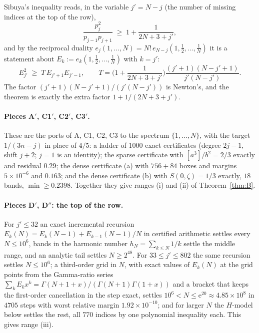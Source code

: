\documentclass[12pt]{article}
\newcommand{\ee}{\mathrm{e}}
\begin{document}
Sibuya's inequality reads, in the variable $j' = N - j$ (the number of missing indices at the top of the row),
\[
\frac{p_j^2}{p_{j-1}p_{j+1}} \;\ge\; 1 + \frac{1}{2N+3+j'} ,
\]
and by the reciprocal duality $e_j(1,\dots,N) = N!\,e_{N-j}(1,\tfrac12,\dots,\tfrac1N)$ it is a statement about $E_k := e_k(1,\tfrac12,\dots,\tfrac1N)$ with $k = j'$:
\begin{equation}\label{eq:sibuyaE}
E_{j'}^2 \;\ge\; T\,E_{j'+1}E_{j'-1}, \qquad T = \Big(1+\frac{1}{2N+3+j'}\Big)\frac{(j'+1)(N-j'+1)}{j'(N-j')} .
\end{equation}
The factor $(j'+1)(N-j'+1)/(j'(N-j'))$ is Newton's, and the theorem is exactly the extra factor $1 + 1/(2N+3+j')$.

\paragraph{Pieces A$'$, C1$'$, C2$'$, C3$'$.}
These are the ports of A, C1, C2, C3 to the spectrum $\{1,\dots,N\}$, with the target $1/(3n-j)$ in place of $4/5$: a ladder of $1000$ exact certificates (degree $2j-1$, shift $j+2$; $j=1$ is an identity); the sparse certificate with $[a^3]/b^2 = 2/3$ exactly and residual $0.29$; the dense certificate (a) with $756+84$ boxes and margins $5\times10^{-6}$ and $0.163$; and the dense certificate (b) with $S(0,\zeta) = 1/3$ exactly, $18$ bands, $\min\ge0.2398$. Together they give ranges (i) and (ii) of Theorem~\ref{thm:B}.

\paragraph{Pieces D$'$, D$''$: the top of the row.}
For $j' \le 32$ an exact incremental recursion $E_k(N) = E_k(N-1) + E_{k-1}(N-1)/N$ in certified arithmetic settles every $N\le 10^6$, bands in the harmonic number $h_N = \sum_{k\le N}1/k$ settle the middle range, and an analytic tail settles $N \ge 2^{48}$. For $33\le j'\le 802$ the same recursion settles $N\le10^6$; a third-order grid in $N$, with exact values of $E_k(N)$ at the grid points from the Gamma-ratio series $\sum_k E_k x^k = \Gamma(N+1+x)/(\Gamma(N+1)\Gamma(1+x))$ and a bracket that keeps the first-order cancellation in the step exact, settles $10^6 < N \le \ee^{20} \approx 4.85\times10^8$ in $4705$ steps with worst relative margin $1.92\times10^{-10}$; and for larger $N$ the $H$-model below settles the rest, all $770$ indices by one polynomial inequality each. This gives range (iii).
\end{document}

